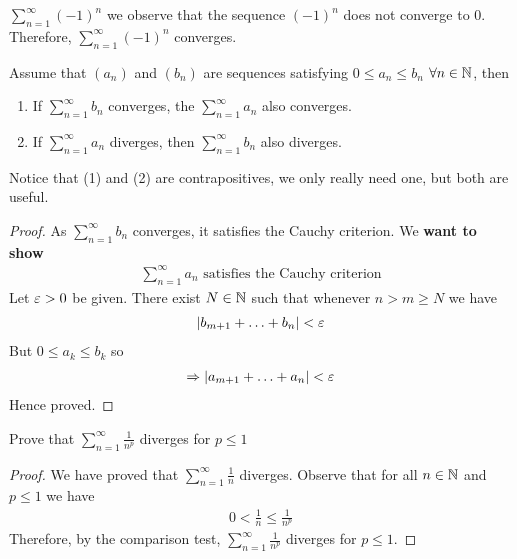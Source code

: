 \begin{eg}
	$\sum_{n=1}^{\infty} \left( -1 \right)^{n}$ we observe that the sequence $\left( -1 \right)^{n}$ does not converge to 0. Therefore, $\sum_{n=1}^{\infty} \left( -1 \right)^{n}$ converges.
\end{eg}

\begin{theorem}
	Assume that $\left( a_n \right) $ and $\left( b_n \right) $ are sequences satisfying $0 \le a_n \le b_n$ $\forall n \in \mathbb{N}$, then
	\begin{enumerate}
		\item If $\sum_{n=1}^{\infty} b_n$ converges, the $\sum_{n=1}^{\infty} a_n$ also converges.
		\item If $\sum_{n=1}^{\infty} a_n$ diverges, then $\sum_{n=1}^{\infty} b_n$ also diverges.
	\end{enumerate}
\end{theorem}

\begin{note}
	Notice that (1) and (2) are contrapositives, we only really need one, but both are useful.
\end{note}

\begin{proof}
	As $\sum_{n=1}^{\infty} b_n$ converges, it satisfies the Cauchy criterion. We \textbf{want to show}
	\begin{align}
		\sum_{n=1}^{\infty} a_n \text{ satisfies the Cauchy criterion}
	\end{align}
	Let $\e>0$ be given. There exist $N \in \mathbb{N}$ such that whenever $n > m \ge N$ we have 
	\begin{align}
		\left|b_{m+1} + \ldots + b_n\right| < \e
	\end{align}
	But $0 \le a_k \le b_k$ so 
	\begin{align}
		\implies \left|a_{m+1} + \ldots + a_n\right| < \e
	\end{align}
	Hence proved.
\end{proof}

\begin{eg}
	Prove that $\sum_{n=1}^{\infty} \frac{1}{n^{p}}$ diverges for $p \le 1$
\end{eg}

\begin{proof}
	We have proved that $\sum_{n=1}^{\infty} \frac{1}{n}$ diverges. Observe that for all $n \in \mathbb{N}$ and $p \le 1$ we have 
	\begin{align}
		0 < \frac{1}{n} \le  \frac{1}{n^{p}}
	\end{align}
	Therefore, by the comparison test, $\sum_{n=1}^{\infty} \frac{1}{n^{p}}$ diverges for $p \le 1$.
\end{proof}

